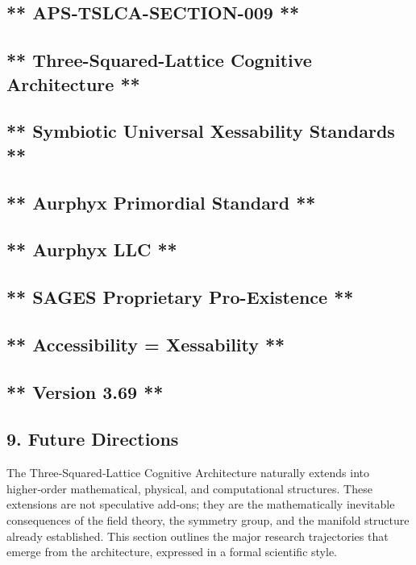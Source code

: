 \subsection{** APS‑TSLCA-SECTION-009 **}\label{apstslca-section-009}

\subsection{** Three-Squared-Lattice Cognitive Architecture **}\label{three-squared-lattice-cognitive-architecture}

\subsection{** Symbiotic Universal Xessability Standards **}\label{symbiotic-universal-xessability-standards}

\subsection{** Aurphyx Primordial Standard **}\label{aurphyx-primordial-standard}

\subsection{** Aurphyx LLC **}\label{aurphyx-llc}

\subsection{** SAGES \textbar{} Proprietary \textbar{} Pro-Existence **}\label{sages-proprietary-pro-existence}

\subsection{** Accessibility = Xessability **}\label{accessibility-xessability}

\subsection{** Version 3.69 **}\label{version-3.69}

\subsection{9. Future Directions}\label{future-directions}

The Three‑Squared‑Lattice Cognitive Architecture naturally extends into higher‑order mathematical, physical, and computational structures. These extensions are not speculative add‑ons; they are the mathematically inevitable consequences of the field theory, the symmetry group, and the manifold structure already established. This section outlines the major research trajectories that emerge from the architecture, expressed in a formal scientific style.

